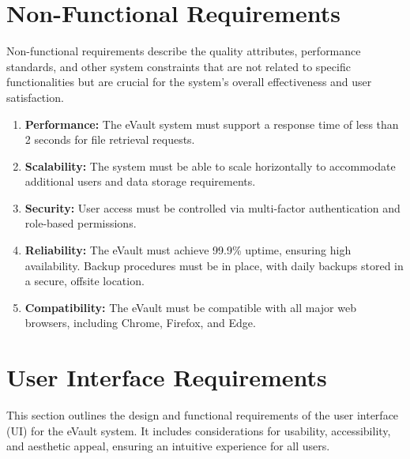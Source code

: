 \documentclass[12pt,a4paper]{report}
\begin{document}
\section{Non-Functional Requirements}

Non-functional requirements describe the quality attributes, performance standards, and other system constraints that are not related to specific functionalities but are crucial for the system’s overall effectiveness and user satisfaction.

\begin{enumerate}
    \item \textbf{Performance:}
        The eVault system must support a response time of less than 2 seconds for file retrieval requests.
    
    \item \textbf{Scalability:}
        The system must be able to scale horizontally to accommodate additional users and data storage requirements.
    
    \item \textbf{Security:}
    User access must be controlled via multi-factor authentication and role-based permissions.
    
    \item \textbf{Reliability:}
        The eVault must achieve 99.9\% uptime, ensuring high availability.
        Backup procedures must be in place, with daily backups stored in a secure, offsite location.
    
    \item \textbf{Compatibility:}
        The eVault must be compatible with all major web browsers, including Chrome, Firefox, and Edge.


\end{enumerate}

   \section{User Interface Requirements}

   This section outlines the design and functional requirements of the user interface (UI) for the eVault system. It includes considerations for usability, accessibility, and aesthetic appeal, ensuring an intuitive experience for all users.
   
\end{document}
